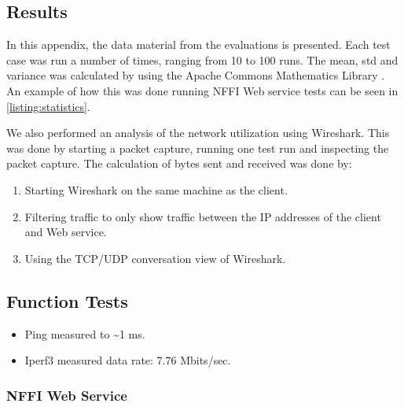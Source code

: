 \begin{appendices}
\chapter{Results}
\label{appendix-results}

In this appendix, the data material from the evaluations is presented. Each test
case was run a number of times, ranging from 10 to 100 runs. The mean, \gls{std}
and variance was calculated by using the Apache Commons Mathematics
Library \cite{apache-math-homepage}. An example of how this was done running NFFI
Web service tests can be seen in \cref{listing:statistics}.




We also performed an analysis of the network utilization using Wireshark. This was done by starting a packet capture, running one test run and inspecting the packet capture. The calculation of bytes sent and received was done by:

\begin{enumerate}
    \item Starting Wireshark on the same machine as the client.
    \item Filtering traffic to only show traffic between the IP addresses of the client and Web service.
    \item Using the TCP/UDP conversation view of Wireshark.
\end{enumerate}

\section{Function Tests}

\begin{itemize}
	\item Ping measured to \textasciitilde 1 ms.
	\item Iperf3 measured data rate: 7.76 Mbits/sec.
\end{itemize}


\subsection{NFFI Web Service}


\end{appendices}
